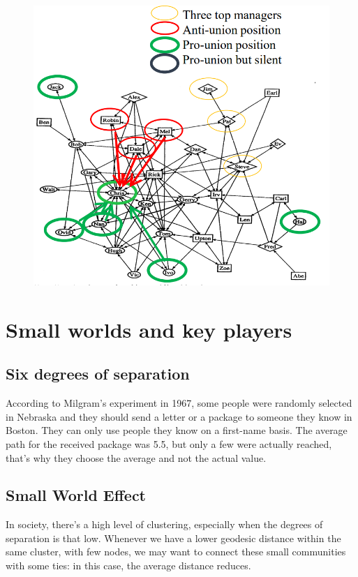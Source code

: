 \documentclass[
  notitlepage,
  onecolumn,
  openany]{book}
\begin{document}
\begin{figure}[h!]

{\centering \includegraphics[width=0.5\linewidth]{images/07-Triads and structural holes/Untitled 3} 

}

\end{figure}

\hypertarget{small-worlds-and-key-players}{%
\section{Small worlds and key players}\label{small-worlds-and-key-players}}

\hypertarget{six-degrees-of-separation}{%
\subsection{Six degrees of separation}\label{six-degrees-of-separation}}

According to Milgram's experiment in 1967, some people were randomly selected in Nebraska and they should send a letter or a package to someone they know in Boston. They can only use people they know on a first-name basis. The average path for the received package was 5.5, but only a few were actually reached, that's why they choose the average and not the actual value.

\hypertarget{small-world-effect}{%
\subsection{Small World Effect}\label{small-world-effect}}

In society, there's a high level of clustering, especially when the degrees of separation is that low. Whenever we have a lower geodesic distance within the same cluster, with few nodes, we may want to connect these small communities with some ties: in this case, the average distance reduces.
\end{document}
